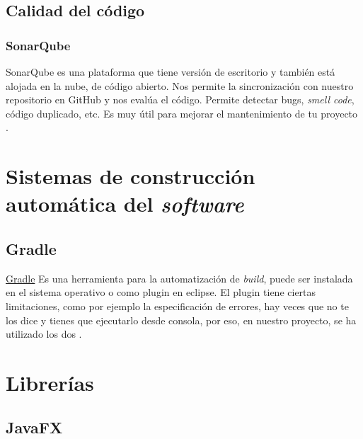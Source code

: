 
\subsection{Calidad del código}\label{calidad-del-codigo}

\subsubsection{SonarQube}\label{sonarqube}

SonarQube es una plataforma que tiene versión de escritorio y también está alojada en la nube, de código abierto. Nos permite la sincronización con nuestro repositorio en GitHub y nos evalúa el código. Permite detectar bugs, \emph{smell code}, código duplicado, etc. Es muy útil para mejorar el mantenimiento de tu proyecto \cite{web:sonarqube}.

\section{Sistemas de construcción automática del
	\emph{software}}\label{sistemas-de-construccion-automuxe1tica-del-software}



\subsection{Gradle}\label{gradle}
\href{https://gradle.org/}{Gradle} Es una herramienta para la automatización de \emph{build}, puede ser instalada en el sistema operativo o como plugin en eclipse. El plugin tiene ciertas limitaciones, como por ejemplo la especificación de errores, hay veces que no te los dice y tienes que ejecutarlo desde consola, por eso, en nuestro proyecto, se ha utilizado los dos \cite{gradle}.


\newpage\section{Librerías}\label{libreruxedas}


\subsection{JavaFX}\label{javafx}

